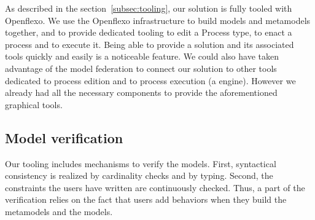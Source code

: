 As described in the section~\ref{subsec:tooling}, our solution is fully tooled with
Openflexo.  We use the Openflexo infrastructure to build models and metamodels
together, and to provide dedicated tooling to edit a Process type, to enact a
process and to execute it. Being able to provide a solution and its associated
tools quickly and easily is a noticeable feature.  We could also have taken
advantage of the model federation to connect our solution to other tools
dedicated to process edition and to process execution (\eg a \BPMN engine).
However we already had all the necessary components to provide the
aforementioned graphical tools.

\subsection{Model verification}


Our tooling includes mechanisms to verify the models. First, syntactical
consistency is realized by cardinality checks and by typing. Second, the
constraints the users have written are continuously checked. Thus, a part of
the verification relies on the fact that users add behaviors when they build
the metamodels and the models.
